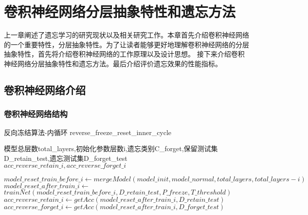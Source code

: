 
\chapter{卷积神经网络分层抽象特性和遗忘方法}
上一章阐述了遗忘学习的研究现状以及相关研究工作。本章首先介绍卷积神经网络的一个重要特性，分层抽象特性。为了让读者能够更好地理解卷积神经网络的分层抽象特性，首先将介绍卷积神经网络的工作原理以及设计思想。
接下来介绍卷积神经网络分层抽象特性和遗忘方法。最后介绍评价遗忘效果的性能指标。

\section{卷积神经网络介绍}

\subsection{卷积神经网络结构}
\begin{algorithm}
	\renewcommand{\algorithmicrequire}{\textbf{Input:}}
	\renewcommand{\algorithmicensure}{\textbf{Output:}}
	\caption{反向冻结算法-内循环 reverse\_freeze\_reset\_inner\_cycle}
	\label{algorithm:reverse_freeze_reset_inner_cycle}
	\begin{algorithmic}[1]
        \REQUIRE 模型总层数total\_layers,初始化参数层数i,遗忘类别C\_forget,保留测试集D\_retain\_test,遗忘测试集D\_forget\_test
        \ENSURE  $acc\_reverse\_retain\_i, acc\_reverse\_forget\_i  $

		\STATE $model\_reset\_train\_before\_i \gets mergeModel(model\_init, model\_normal, total\_layers, total\_layers - i)$
		\STATE $model\_reset\_after\_train\_i \gets$ \\
         $trainNet(model\_reset\_train\_before\_i , D\_retain\_test, P\_freeze, T\_threshold)$
		\STATE $acc\_reverse\_retain\_i \gets getAcc(model\_reset\_after\_train\_i, D\_retain\_test)$
		\STATE $acc\_reverse\_forget\_i  \gets getAcc(model\_reset\_after\_train\_i, D\_forget\_test)$
	\end{algorithmic}  
\end{algorithm}

